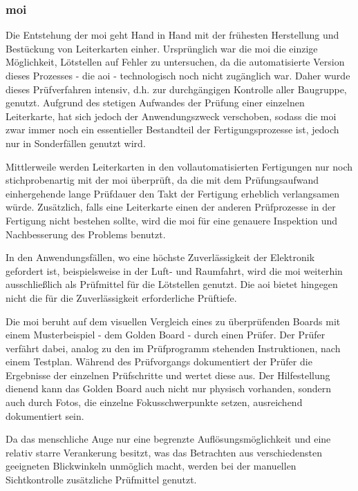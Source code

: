 \subsubsection{\acl{moi}}
    Die Entstehung der \ac{moi} geht Hand in Hand mit der frühesten Herstellung und Bestückung von Leiterkarten einher.
    Ursprünglich war die \ac{moi} die einzige Möglichkeit, Lötstellen auf Fehler zu untersuchen, da die automatisierte Version dieses Prozesses - die \ac{aoi} - technologisch noch nicht zugänglich war.
    Daher wurde dieses Prüfverfahren intensiv, d.h. zur durchgängigen Kontrolle aller Baugruppe, genutzt.
    Aufgrund des stetigen Aufwandes der Prüfung einer einzelnen Leiterkarte, hat sich jedoch der Anwendungszweck verschoben, sodass die \ac{moi} zwar immer noch ein essentieller Bestandteil der Fertigungsprozesse ist, jedoch nur in Sonderfällen genutzt wird. \cite{berger_test-_2012}

        Mittlerweile werden Leiterkarten in den vollautomatisierten Fertigungen nur noch stichprobenartig mit der \ac{moi} überprüft, da die mit dem Prüfungsaufwand einhergehende lange Prüfdauer den Takt der Fertigung erheblich verlangsamen würde.
        Zusätzlich, falls eine Leiterkarte einen der anderen Prüfprozesse in der Fertigung nicht bestehen sollte, wird die \ac{moi} für eine genauere Inspektion und Nachbesserung des Problems benutzt.

        In den Anwendungsfällen, wo eine höchste Zuverlässigkeit der Elektronik gefordert ist, beispielsweise in der Luft- und Raumfahrt, wird die \ac{moi} weiterhin ausschließlich als Prüfmittel für die Lötstellen genutzt.
        Die \ac{aoi} bietet hingegen nicht die für die Zuverlässigkeit erforderliche Prüftiefe. \cite{berger_test-_2012}

        Die \ac{moi} beruht auf dem visuellen Vergleich eines zu überprüfenden Boards mit einem Musterbeispiel - dem Golden Board - durch einen Prüfer.
        Der Prüfer verfährt dabei, analog zu den im Prüfprogramm  stehenden Instruktionen, nach einem Testplan.
        Während des Prüfvorgangs dokumentiert der Prüfer die Ergebnisse der einzelnen Prüfschritte und wertet diese aus.
        Der Hilfestellung dienend kann das Golden Board auch nicht nur physisch vorhanden, sondern auch durch Fotos, die einzelne Fokusschwerpunkte setzen, ausreichend dokumentiert sein. \cite{berger_test-_2012}

        Da das menschliche Auge nur eine begrenzte Auflösungsmöglichkeit und eine relativ starre Verankerung besitzt, was das Betrachten aus verschiedensten geeigneten Blickwinkeln unmöglich macht, werden bei der manuellen Sichtkontrolle zusätzliche Prüfmittel genutzt.
        
